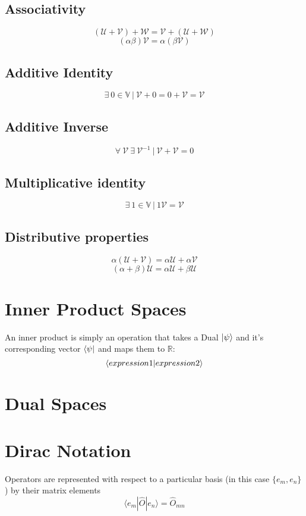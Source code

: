 \subsection{Associativity}
$$(\mathcal{U} + \mathcal{V}) + \mathcal{W} = \mathcal{V} + (\mathcal{U} + \mathcal{W})$$
$$(\alpha \beta) \mathcal{V} = \alpha (\beta \mathcal{V})$$
\subsection{Additive Identity}
$$\exists \  0 \in \mathbb{V} \ | \ \mathcal{V} + 0 = 0 + \mathcal{V} = \mathcal{V}$$
\subsection{Additive Inverse}
$$\forall \ \mathcal{V} \ \exists \ \mathcal{V}^{-1} \ | \ \mathcal{V} + \mathcal{V} = 0$$
\subsection{Multiplicative identity}
$$\exists \ 1 \in \mathbb{V} \ | \ 1 \mathcal{V} = \mathcal{V}$$
\subsection{Distributive properties}
$$\alpha (\mathcal{U} + \mathcal{V}) = \alpha \mathcal{U} + \alpha \mathcal{V}$$
$$(\alpha + \beta) \mathcal{U} = \alpha \mathcal{U} + \beta \mathcal{U}$$
\section{Inner Product Spaces}
An inner product is simply an operation that takes a Dual $\ket{\psi}$ and it's corresponding vector $\bra{\psi}$ and maps them to $\mathbb{R}$:
$$\braket{expression1}{expression2}$$
\section{Dual Spaces}
\section{Dirac Notation}
Operators are represented with respect to a particular basis (in this case $\{e_{m}, e_{n}\}$) by their matrix elements
\begin{equation}
\langle e_{m}| \hat{O} | {e_n} \rangle = \hat{O}_{mn}
\end{equation}

